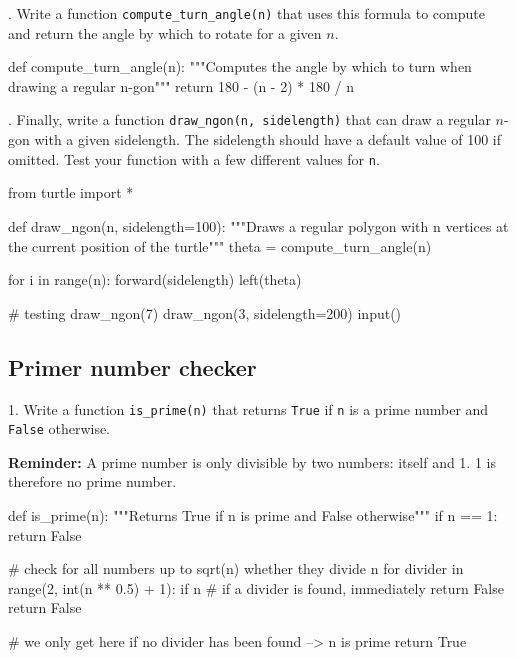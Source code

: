 . Write a function \texttt{compute\_turn\_angle(n)} that uses this formula to compute and return the angle by which to rotate for a given $n$.

\begin{solution}
    \begin{pythoncode}
def compute_turn_angle(n):
    """Computes the angle by which to turn when drawing a regular n-gon"""
    return 180 - (n - 2) * 180 / n
    \end{pythoncode}
\end{solution}

\vspace{1em}

. Finally, write a function \texttt{draw\_ngon(n, sidelength)} that can draw a regular $n$-gon with a given sidelength. The sidelength should have a default value of 100 if omitted. Test your function with a few different values for \texttt{n}.

\begin{solution}
    \begin{pythoncode}
from turtle import *

def draw_ngon(n, sidelength=100):
    """Draws a regular polygon with n vertices at the current position of the turtle"""
    theta = compute_turn_angle(n)

    for i in range(n):
        forward(sidelength)
        left(theta)

# testing
draw_ngon(7)
draw_ngon(3, sidelength=200)
input()

    \end{pythoncode}
\end{solution}

\subsection{Primer number checker}

1. Write a function \texttt{is\_prime(n)} that returns \texttt{True} if \texttt{n} is a prime number and \texttt{False} otherwise.

\vspace{1em}

\noindent \textbf{Reminder:} A prime number is only divisible by two numbers: itself and 1. 1 is therefore no prime number.

\begin{solution}
    \begin{pythoncode}
def is_prime(n):
    """Returns True if n is prime and False otherwise"""
    if n == 1:
        return False

    # check for all numbers up to sqrt(n) whether they divide n
    for divider in range(2, int(n ** 0.5) + 1):
        if n %
            # if a divider is found, immediately return False
            return False

    # we only get here if no divider has been found --> n is prime
    return True

    \end{pythoncode}
\end{solution}

